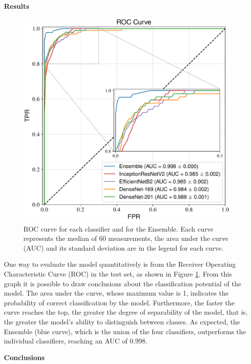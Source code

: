 \documentclass[10pt, a4paper, twocolumn]{article}
\begin{document}
\break
\begin{center}
  \bf\fontsize{13}{15.6}\selectfont Results
\end{center}

\begin{figure}[!b]
  \includegraphics[width=\linewidth]{figures/roc_mn170_en.pdf}
  \caption{ROC curve for each classifier and for the Ensemble. Each curve represents the median of 60 measurements, the area under the curve (AUC) and its standard deviation are in the legend for each curve.}
  \label{fig:roc}
\end{figure}

One way to evaluate the model quantitatively is from the Receiver Operating Characteristic Curve (ROC) in the test set, as shown in Figure \ref{fig:roc}. From this graph it is possible to draw conclusions about the classification potential of the model. The area under the curve, whose maximum value is 1, indicates the probability of correct classification by the model. Furthermore, the faster the curve reaches the top, the greater the degree of separability of the model, that is, the greater the model's ability to distinguish between classes. As expected, the Ensemble (blue curve), which is the union of the four classifiers, outperforms the individual classifiers, reaching an AUC of 0.998.

\begin{center}
  \bf\fontsize{13}{15.6}\selectfont Conclusions
\end{center}
\end{document}
